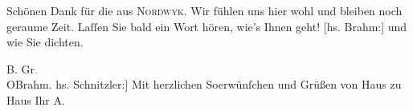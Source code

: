            \vspace{1em}
\pstart
           \noindent{}{\pb}Schönen Dank für die \label{K_L03013-1v}\label{K_L03013-1} aus \textsc{Nordwyk}. Wir fühlen uns hier wohl
               und bleiben noch geraume Zeit. Laſſen Sie bald ein Wort hören, wie’s Ihnen geht!
                  {[}hs. Brahm:{]} und wie Sie dichten.\pend
           
\pstart
           B. Gr\textcolor{gray}{.}{\\}\spacefill\mbox{OBrahm.}\pend
           \pstart {[}hs. Schnitzler:{]} Mit herzlichen So{\geminationm}erwünſchen und Grüßen von Haus zu Haus Ihr \spacefill\mbox{A.}\pend{}
\pstart
           \raggedleft{}\label{T_L03013-1v}\label{T_L03013-1}\pend
           \endnumbering{}  \newcommand{\dateiname}{L03013}\newcommand{\titel}{Arthur Schnitzler und Otto Brahm an Felix Salten, 19. 7. 1908}\newcommand{\editorInnen}{Martin Anton Müller und Laura Untner}
